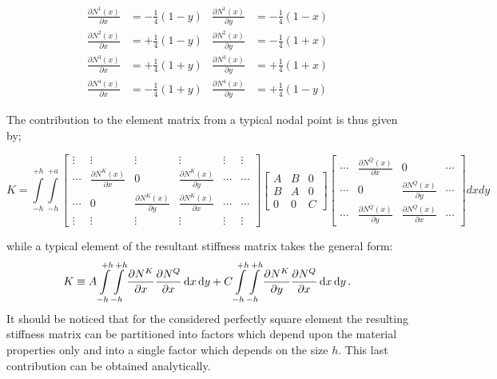 \begin{align*}
\frac{{\partial {N^1}(x)}}{{\partial x}} & =  - \frac{1}{4}(1 - y)           &  \frac{{\partial {N^1}(x)}}{{\partial y}} & =  - \frac{1}{4}(1 - x)\\
\frac{{\partial {N^2}(x)}}{{\partial x}} & =  + \frac{1}{4}(1 - y)           &  \frac{{\partial {N^2}(x)}}{{\partial y}} & =  - \frac{1}{4}(1 + x)\\
\frac{{\partial {N^3}(x)}}{{\partial x}} & =  + \frac{1}{4}(1 + y)           &  \frac{{\partial {N^3}(x)}}{{\partial y}} & =  + \frac{1}{4}(1 + x)\\
\frac{{\partial {N^4}(x)}}{{\partial x}} & =  - \frac{1}{4}(1 + y)           &  \frac{{\partial {N^4}(x)}}{{\partial y}} & =  + \frac{1}{4}(1 - y)
\end{align*}


The contribution to the element matrix from a typical nodal point is thus given by;



\[K = \int\limits_{ - h}^{ + h} {\int\limits_{ - h}^{ + a} {\begin{bmatrix}

 \vdots &  \vdots & \vdots &  \vdots & \vdots & \vdots \\
 \cdots &  \frac{{\partial {N^K}(x)}}{{\partial x}} & 0   & \frac{{\partial {N^K}(x)}}{{\partial y}} &  \cdots & \cdots \\
  \cdots &  0 & \frac{{\partial {N^K}(x)}}{{\partial y}}   & \frac{{\partial {N^K}(x)}}{{\partial x}} &  \cdots & \cdots \\
 \vdots &  \vdots & \vdots &  \vdots & \vdots & \vdots 

\end{bmatrix}
%
\begin{bmatrix}
 A & B &  0\\
 B & A & 0 \\
 0 &  0 & C
\end{bmatrix}
%
\begin{bmatrix}
 \cdots & \frac{{\partial {N^Q}(x)}}{{\partial x}} & 0  & \cdots \\
 \cdots & 0 & \frac{{\partial {N^Q}(x)}}{{\partial y}}  & \cdots \\
 \cdots & \frac{{\partial {N^Q}(x)}}{{\partial y}} & \frac{{\partial {N^Q}(x)}}{{\partial x}}  & \cdots 
\end{bmatrix} dxdy} } \]


while a typical element of the resultant stiffness matrix takes the general form:
\[K \equiv A\int\limits_{- h}^{ + h} \int\limits_{-h}^{+h} \pdv{N^K}{x}\pdv{N^Q}{x}\dd{x}\dd{y}  + C\int\limits_{-h}^{+h} \int\limits_{-h}^{+h}\pdv{N^K}{y}\pdv{N^Q}{x}\dd{x}\dd{y}.\]
It should be noticed that for the considered perfectly square element the resulting stiffness matrix can be partitioned into factors which depend upon the material properties only and into a single factor which depends on the size $h$. This last contribution can be obtained analytically.

